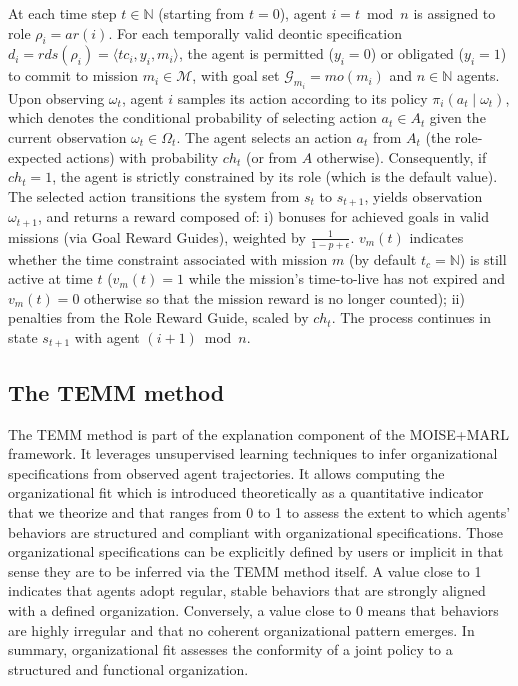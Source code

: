 \documentclass[pdflatex,sn-mathphys-num]{sn-jnl}%
\theoremstyle{thmstyleone}%
\theoremstyle{thmstyletwo}%
\theoremstyle{thmstylethree}%
\begin{document}
\noindent At each time step $t \in \mathbb{N}$ (starting from $t=0$), agent $i = t \bmod n$ is assigned to role $\rho_i = ar(i)$. For each temporally valid deontic specification $d_i = rds(\rho_i) = \langle tc_i, y_i, m_i \rangle$, the agent is permitted ($y_i = 0$) or obligated ($y_i = 1$) to commit to mission $m_i \in \mathcal{M}$, with goal set $\mathcal{G}_{m_i} = mo(m_i)$ and $n \in \mathbb{N}$ agents.
%
Upon observing $\omega_t$, agent $i$ samples its action according to its 
policy $\pi_i(a_t \mid \omega_t)$, which denotes the conditional 
probability of selecting action $a_t \in A_t$ given the current observation 
$\omega_t \in \Omega_t$. The agent selects an action $a_t$ from $A_t$ (the role-expected actions) with probability $ch_t$ (or from $A$ otherwise). Consequently, if $ch_t = 1$, the agent is strictly constrained by its role (which is the default value).
%
The selected action transitions the system from $s_t$ to $s_{t+1}$, yields observation $\omega_{t+1}$, and returns a reward composed of:
i) bonuses for achieved goals in valid missions (via Goal Reward Guides), weighted by $\frac{1}{1 - p + \epsilon}$. $v_m(t)$ indicates whether the time constraint associated with mission $m$ (by default $t_c = \mathbb{N}$) is still active at time $t$ ($v_m(t)=1$ while the mission's time-to-live has not expired and $v_m(t)=0$ otherwise so that the mission reward is no longer counted);
ii) penalties from the Role Reward Guide, scaled by $ch_t$.
%
The process continues in state $s_{t+1}$ with agent $(i + 1) \bmod n$.

\subsection{The TEMM method}
\label{sec:TEMM_algorithm}

The TEMM method is part of the explanation component of the MOISE+MARL framework. It leverages unsupervised learning techniques to infer organizational specifications from observed agent trajectories. It allows computing the organizational fit which is introduced theoretically as a quantitative indicator that we theorize and that ranges from 0 to 1 to assess the extent to which agents' behaviors are structured and compliant with organizational specifications. Those organizational specifications can be explicitly defined by users or implicit in that sense they are to be inferred via the TEMM method itself. A value close to 1 indicates that agents adopt regular, stable behaviors that are strongly aligned with a defined organization. Conversely, a value close to 0 means that behaviors are highly irregular and that no coherent organizational pattern emerges. In summary, organizational fit assesses the conformity of a joint policy to a structured and functional organization.
\end{document}
